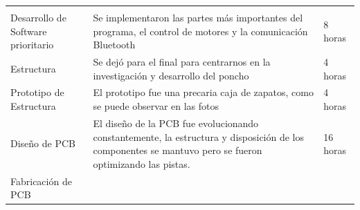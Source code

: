 \begin{longtable}[]{@{}lll@{}}
\begin{minipage}[t]{0.10\columnwidth}
\end{minipage}\tabularnewline
\begin{minipage}[t]{0.17\columnwidth}\raggedright
Desarrollo de Software prioritario\strut
\end{minipage} & \begin{minipage}[t]{0.64\columnwidth}\raggedright
Se implementaron las partes más importantes del programa, el control de
motores y la comunicación Bluetooth\strut
\end{minipage} & \begin{minipage}[t]{0.10\columnwidth}\raggedright
8 horas\strut
\end{minipage}\tabularnewline
\begin{minipage}[t]{0.17\columnwidth}\raggedright
Estructura\strut
\end{minipage} & \begin{minipage}[t]{0.64\columnwidth}\raggedright
Se dejó para el final para centrarnos en la investigación y desarrollo
del poncho\strut
\end{minipage} & \begin{minipage}[t]{0.10\columnwidth}\raggedright
4 horas\strut
\end{minipage}\tabularnewline
\begin{minipage}[t]{0.17\columnwidth}\raggedright
Prototipo de Estructura\strut
\end{minipage} & \begin{minipage}[t]{0.64\columnwidth}\raggedright
El prototipo fue una precaria caja de zapatos, como se puede observar en
las fotos\strut
\end{minipage} & \begin{minipage}[t]{0.10\columnwidth}\raggedright
4 horas\strut
\end{minipage}\tabularnewline
\begin{minipage}[t]{0.17\columnwidth}\raggedright
Diseño de PCB\strut
\end{minipage} & \begin{minipage}[t]{0.64\columnwidth}\raggedright
El diseño de la PCB fue evolucionando constantemente, la estructura y
disposición de los componentes se mantuvo pero se fueron optimizando las
pistas.\strut
\end{minipage} & \begin{minipage}[t]{0.10\columnwidth}\raggedright
16 horas\strut
\end{minipage}\tabularnewline
\begin{minipage}[t]{0.17\columnwidth}\raggedright
Fabricación de PCB\strut

\end{minipage}
\end{longtable}
